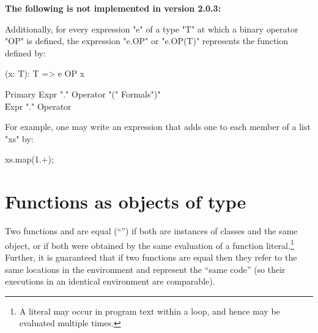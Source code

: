 \begin{planned}

{\bf The following is not implemented in version 2.0.3:}

Additionally, for every expression \xcd"e" of a type \xcd"T" at which a binary
operator \xcd"OP" is defined, the expression \xcd"e.OP" or
\xcd"e.OP(T)" represents the function
defined by:

\begin{xten}
(x: T): T => { e OP x }
\end{xten}

\begin{grammar}
Primary \: Expr \xcd"." Operator \xcd"(" Formals\opt \xcd")" \\
        \| Expr \xcd"." Operator \\
\end{grammar}



For example,
one may write an expression that adds one to each member of a
list \xcd"xs" by:

\begin{xten}
xs.map(1.+);
\end{xten}
%
\end{planned}


\section{Functions as objects of type }
\label{FunctionAnyMethods}

\label{FunctionEquality}
Two functions  and  are equal (``\Xcd{==}'') if both are
instances of classes and the same object, or if both were obtained by
the same evaluation of a function literal.\footnote{A literal may
  occur in program text within a loop, and hence may be evaluated
  multiple times.} Further, it is guaranteed that if two functions are
equal then they refer to the same locations in the environment and
represent the ``same code'' (so their executions in an identical
environment are comparable).


